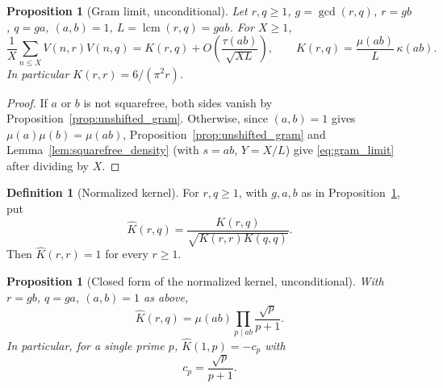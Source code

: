 \documentclass[11pt]{amsart}
\numberwithin{equation}{section}
\theoremstyle{plain}
\newtheorem{proposition}[theorem]{Proposition}
\theoremstyle{definition}
\newtheorem{definition}[theorem]{Definition}
\theoremstyle{remark}
\newcommand{\mob}{\mu}
\newcommand{\Vjump}{V}
\begin{document}
\begin{proposition}[Gram limit, unconditional]
\label{prop:gram_limit}
Let \(r,q\ge1\), \(g=\gcd(r,q)\), \(r=gb\), \(q=ga\), \((a,b)=1\), \(L=\operatorname{lcm}(r,q)=gab\).  For \(X\ge1\),
\begin{equation}
\frac1X\sum_{n\le X}\Vjump(n,r)\Vjump(n,q)=K(r,q)+O\!\left(\frac{\tau(ab)}{\sqrt{XL}}\right),
\qquad
K(r,q)=\frac{\mob(ab)}{L}\,\kappa(ab).
\label{eq:gram_limit}
\end{equation}
In particular \(K(r,r)=6/(\pi^2r)\).
\end{proposition}

\begin{proof}
If \(a\) or \(b\) is not squarefree, both sides vanish by Proposition~\ref{prop:unshifted_gram}.  Otherwise, since \((a,b)=1\) gives \(\mob(a)\mob(b)=\mob(ab)\), Proposition~\ref{prop:unshifted_gram} and Lemma~\ref{lem:squarefree_density} (with \(s=ab\), \(Y=X/L\)) give \eqref{eq:gram_limit} after dividing by \(X\).
\end{proof}

\begin{definition}[Normalized kernel]
\label{def:normalized_kernel}
For \(r,q\ge1\), with \(g,a,b\) as in Proposition~\ref{prop:gram_limit}, put
\begin{equation}
\widehat K(r,q)=\frac{K(r,q)}{\sqrt{K(r,r)K(q,q)}}.
\label{eq:normalized_kernel_def}
\end{equation}
Then \(\widehat K(r,r)=1\) for every \(r\ge1\).
\end{definition}

\begin{proposition}[Closed form of the normalized kernel, unconditional]
\label{prop:normalized_kernel_formula}
With \(r=gb\), \(q=ga\), \((a,b)=1\) as above,
\begin{equation}
\widehat K(r,q)=\mob(ab)\prod_{p\mid ab}\frac{\sqrt p}{p+1}.
\label{eq:normalized_kernel_formula}
\end{equation}
In particular, for a single prime \(p\), \(\widehat K(1,p)=-c_p\) with
\begin{equation}
c_p=\frac{\sqrt p}{p+1}.
\label{eq:cp_def}
\end{equation}
\end{proposition}
\end{document}
